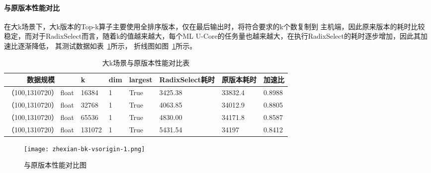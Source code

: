 \paragraph{与原版本性能对比}
在大k场景下，大k版本的Top-k算子主要使用全排序版本，仅在最后输出时，将符合要求的k个数复制到
主机端，因此原来版本的耗时比较稳定，而对于RadixSelect而言，随着k的值越来越大，每个ML
U-Core的任务量也越来越大，在执行RadixSelect的耗时逐步增加，因此其加速比逐渐降低，
其测试数据如表~\ref{tab:bench_bigk}所示，
折线图如图~\ref{fig:bench_bk_vsorigin_zhexian}所示。
\begin{table}
    \centering
    \caption{大k场景与原版本性能对比表}
    \label{tab:bench_bigk}
    \begin{tabular}{cllllll}
        \toprule
        数据规模       &k  & dim  & largest & RadixSelect耗时    & 原版本耗时&加速比 \\
        \midrule
        （100,1310720） float&16384&  1     & True      & 3425.38 & 33832.4 & 0.8988 \\
        （100,1310720） float&32768&  1     & True      & 4063.85 & 34012.9 & 0.8805\\
        （100,1310720） float&65536&  1     & True      & 4830.00 & 34171.8 &0.8587\\
        （100,1310720） float&131072&  1     & True      & 5431.54 & 34197 & 0.8412 \\
        
        \bottomrule
    \end{tabular}
    \end{table}
    \begin{figure}[ht]
        \centering
        \texttt{[image: zhexian-bk-vsorigin-1.png]}
        \caption{与原版本性能对比图}
        \label{fig:bench_bk_vsorigin_zhexian}
    \end{figure}
    
    



